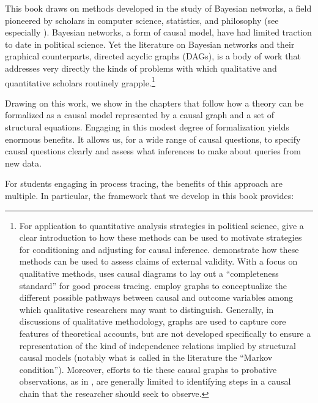 \documentclass[
  12pt,
]{book}
\begin{document}
This book draws on methods developed in the study of Bayesian networks, a field pioneered by scholars in computer science, statistics, and philosophy (see especially \citet{pearl2009causality}). Bayesian networks, a form of causal model, have had limited traction to date in political science. Yet the literature on Bayesian networks and their graphical counterparts, directed acyclic graphs (DAGs), is a body of work that addresses very directly the kinds of problems with which qualitative and quantitative scholars routinely grapple.\footnote{For application to quantitative analysis strategies in political science, \citet{glynn2007non} give a clear introduction to how these methods can be used to motivate strategies for conditioning and adjusting for causal inference. \citet{garcia2015graphical} demonstrate how these methods can be used to assess claims of external validity. With a focus on qualitative methods, \citet{Waldner2015completeness} uses causal diagrams to lay out a ``completeness standard'' for good process tracing. \citet{weller2014finding} employ graphs to conceptualize the different possible pathways between causal and outcome variables among which qualitative researchers may want to distinguish. Generally, in discussions of qualitative methodology, graphs are used to capture core features of theoretical accounts, but are not developed specifically to ensure a representation of the kind of independence relations implied by structural causal models (notably what is called in the literature the ``Markov condition''). Moreover, efforts to tie these causal graphs to probative observations, as in \citet{Waldner2015completeness}, are generally limited to identifying steps in a causal chain that the researcher should seek to observe.}

Drawing on this work, we show in the chapters that follow how a theory can be formalized as a causal model represented by a causal graph and a set of structural equations. Engaging in this modest degree of formalization yields enormous benefits. It allows us, for a wide range of causal questions, to specify causal questions clearly and assess what inferences to make about queries from new data.

For students engaging in process tracing, the benefits of this approach are multiple. In particular, the framework that we develop in this book provides:
\end{document}
